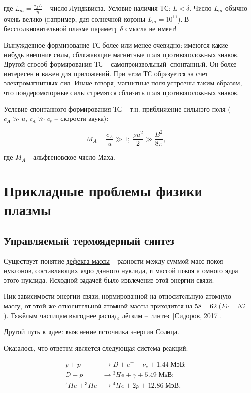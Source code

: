 \documentclass[10pt, a4paper]{article}
\newcommand{\Sidorov}{~[Сидоров, 2017]}
\let\stdsection\section
\renewcommand\section{\newpage\stdsection}
\begin{document}
где $L_m = \frac{c_AL}{\eta}$ -- число Лундквиста. Условие наличия ТС: $L<\delta$. Число $L_m$ обычно очень велико (например, для солнечной короны $L_m=10^{11}$). В бесстолкновительной плазме параметр $\delta$ смысла не имеет!

Вынужденное формирование ТС более или менее очевидно: имеются какие-нибудь внешние силы, сближающие магнитные поля противоположных знаков. Другой способ формирования ТС -- самопроизвольный, спонтанный. Он более интересен и важен для приложений. При этом ТС образуется за счет электромагнитных сил. Иначе говоря, магнитные поля устроены таким образом, что пондеромоторные силы стремятся сблизить поля противоположных знаков.

Условие спонтанного формирования ТС -- т.н. приближение сильного поля ($c_A \gg u$, $c_A \gg c_s$ -- скорости звука):

\begin{equation*}
	M_A = \frac{c_A}{u} \gg 1;\;\frac{\rho u^2}{2} \gg \frac{B^2}{8\pi},
\end{equation*}

где $M_A$ -- альфвеновское число Маха.

\section{Прикладные проблемы физики плазмы}

\subsection{Управляемый термоядерный синтез}

Существует понятие \uline{дефекта массы} -- разности между суммой масс покоя нуклонов, составляющих ядро данного нуклида, и массой покоя атомного ядра этого нуклида. Исходной задачей было извлечение этой энергии связи.

Пик зависимости энергии связи, нормированной на относительную атомную массу, от этой же относительной атомной массы приходится на $58-62$ ($Fe-Ni$). Тяжёлым частицам выгоднее распад, лёгким -- синтез\Sidorov.

Другой путь к идее: выяснение источника энергии Солнца. 

Оказалось, что ответом является следующая система реакций:

\begin{align*}
	p + p &\rightarrow D + e^{+} + \nu_e + 1.44\;\text{МэВ}; \\
	D + p &\rightarrow {}^3He + \gamma + 5.49\;\text{МэВ}; \\
	{}^3He + {}^3He &\rightarrow {}^4He + 2p + 12.86\;\text{МэВ},
\end{align*}
\end{document}
